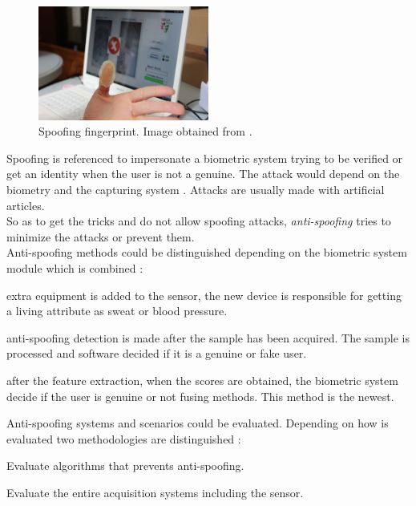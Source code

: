 \begin{figure}[htb]
\centering
\includegraphics[width=0.5\textwidth]{images_miscelaneus/spoofing_fingerprint.jpg}
\caption{Spoofing fingerprint. Image obtained from \cite{fingerprint_image}.} \label{fig:Spoof_fingerprint}
\end{figure}

Spoofing is referenced to impersonate a biometric system trying to be verified or get an identity when the user is not a genuine. The attack would depend on the biometry and the capturing system \cite{Spoofing_survey}. Attacks are usually made with artificial articles.\\

So as to get the tricks and do not allow spoofing attacks, \textit{anti-spoofing} tries to minimize the attacks or prevent them.\\

Anti-spoofing methods could be distinguished depending on the biometric system module which is combined \cite{Spoofing_survey}:
\begin{description}[itemsep=2pt,topsep=8pt,parsep=0pt,partopsep=20pt]
\item[Sensor level:] extra equipment is added to the sensor, the new device is responsible for getting a living attribute as sweat or blood pressure.
\item[Feature level:] anti-spoofing detection is made after the sample has been acquired. The sample is processed and software decided if it is a genuine or fake user.
\item[Score level:] after the feature extraction, when the scores are obtained, the biometric system decide if the user is genuine or not fusing methods. This method is the newest.
\end{description}

Anti-spoofing systems and scenarios could be evaluated. Depending on how is evaluated two methodologies are distinguished \cite{Spoofing_survey}:
\begin{description}[itemsep=2pt,topsep=8pt,parsep=0pt,partopsep=20pt]
\item[Algorithm-based or technology evaluation:] Evaluate algorithms that prevents anti-spoofing.
\item[System-based or scenario evaluation:] Evaluate the entire acquisition systems including the sensor.
\end{description}

